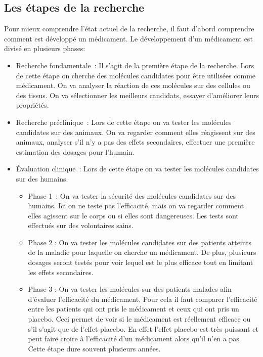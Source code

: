\documentclass[12pt,a4paper]{report}
\begin{document}
\listoffigures

\begin{appendix}

    \chapter{Les étapes de la recherche} \label{annexe:etapes_recherche}

    Pour mieux comprendre l'état actuel de la recherche, il faut d'abord comprendre comment est développé un médicament.
Le développement d'un médicament est divisé en plusieurs phases: \cite{DeveloppementMedicamentInserm}

\begin{itemize}
    \item Recherche fondamentale : Il s'agit de la première étape de la recherche.
    Lors de cette étape on cherche des molécules candidates pour être utilisées comme médicament.
    On va analyser la réaction de ces molécules sur des cellules ou des tissus.
    On va sélectionner les meilleurs candidats, essayer d'améliorer leurs propriétés.

    \item Recherche préclinique : Lors de cette étape on va tester les molécules candidates sur des animaux.
    On va regarder comment elles réagissent sur des animaux, analyser s'il n'y a pas des effets secondaires, effectuer une première estimation des dosages pour l'humain.

    \item Évaluation clinique : Lors de cette étape on va tester les molécules candidates sur des humains.

    \begin{itemize}
        \item Phase 1 : On va tester la sécurité des molécules candidates sur des humains. Ici on ne teste pas l'efficacité, mais on va regarder comment elles agissent sur le corps ou si elles sont dangereuses. Les tests sont effectués sur des volontaires sains.
        \item Phase 2 : On va tester les molécules candidates sur des patients atteints de la maladie pour laquelle on cherche un médicament. De plus, plusieurs dosages seront testés pour voir lequel est le plus efficace tout en limitant les effets secondaires.
        \item Phase 3 : On va tester les molécules sur des patients malades afin d'évaluer l'efficacité du médicament. Pour cela il faut comparer l'efficacité entre les patients qui ont pris le médicament et ceux qui ont pris un placebo. Ceci permet de voir si le médicament est réellement efficace ou s'il s'agit que de l'effet placebo. En effet l'effet placebo est très puissant et peut faire croire à l'efficacité d'un médicament alors qu'il n'en a pas. \cite{decraenPlacebosPlaceboEffects1999} Cette étape dure souvent plusieurs années.
    \end{itemize}


\end{itemize}
\end{appendix}
\end{document}
